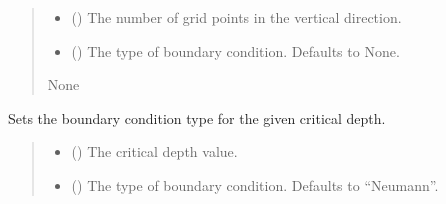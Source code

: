 \documentclass[a4paper,11pt,english,openany]{sphinxmanual}
\begin{document}
\begin{fulllineitems}
\begin{fulllineitems}
\begin{quote}
\begin{description}
\begin{itemize}
\item {} 
\sphinxAtStartPar
{} () \textendash{} The number of grid points in the vertical direction.

\item {} 
\sphinxAtStartPar
{} (\sphinxstyleliteralemphasis{\sphinxupquote{, }}) \textendash{} The type of boundary condition. Defaults to None.

\end{itemize}

\sphinxAtStartPar
None

\end{description}\end{quote}

\end{fulllineitems}


\begin{fulllineitems}
\label{\detokenize{api/spyice.preprocess.modify_initial_boundary:spyice.preprocess.modify_initial_boundary.ModifyInitialBoundary.set_boundary_condition_type}}
\pysigstartsignatures
{}
\pysigstopsignatures
\sphinxAtStartPar
Sets the boundary condition type for the given critical depth.
\begin{quote}\begin{description}
\begin{itemize}
\item {} 
\sphinxAtStartPar
{} () \textendash{} The critical depth value.

\item {} 
\sphinxAtStartPar
{} (\sphinxstyleliteralemphasis{\sphinxupquote{, }}) \textendash{} The type of boundary condition. Defaults to “Neumann”.


\end{itemize}
\end{description}
\end{quote}
\end{fulllineitems}
\end{fulllineitems}
\end{document}
